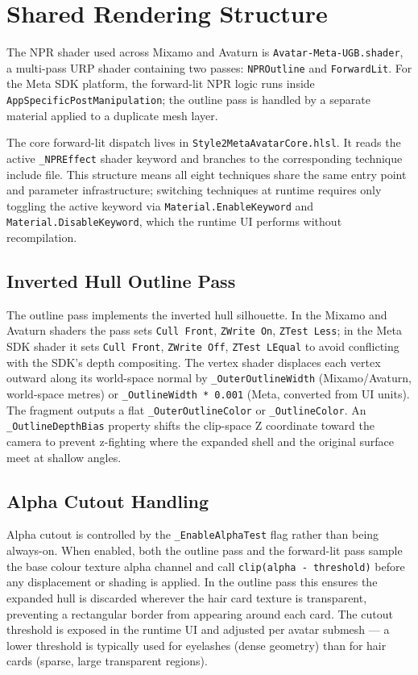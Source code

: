 \section{Shared Rendering Structure}
\label{sec:impl_shared}

The NPR shader used across Mixamo and Avaturn is \texttt{Avatar-Meta-UGB.shader}, a multi-pass URP shader containing two passes: \texttt{NPROutline} and \texttt{ForwardLit}. For the Meta SDK platform, the forward-lit NPR logic runs inside \texttt{AppSpecificPostManipulation}; the outline pass is handled by a separate material applied to a duplicate mesh layer.

The core forward-lit dispatch lives in \texttt{Style2MetaAvatarCore.hlsl}. It reads the active \texttt{\_NPREffect} shader keyword and branches to the corresponding technique include file. This structure means all eight techniques share the same entry point and parameter infrastructure; switching techniques at runtime requires only toggling the active keyword via \texttt{Material.EnableKeyword} and \texttt{Material.DisableKeyword}, which the runtime UI performs without recompilation.

\subsection{Inverted Hull Outline Pass}
\label{sec:impl_outline}

The outline pass implements the inverted hull silhouette. In the Mixamo and Avaturn shaders the pass sets \texttt{Cull Front}, \texttt{ZWrite On}, \texttt{ZTest Less}; in the Meta SDK shader it sets \texttt{Cull Front}, \texttt{ZWrite Off}, \texttt{ZTest LEqual} to avoid conflicting with the SDK's depth compositing. The vertex shader displaces each vertex outward along its world-space normal by \texttt{\_OuterOutlineWidth} (Mixamo/Avaturn, world-space metres) or \texttt{\_OutlineWidth * 0.001} (Meta, converted from UI units). The fragment outputs a flat \texttt{\_OuterOutlineColor} or \texttt{\_OutlineColor}. An \texttt{\_OutlineDepthBias} property shifts the clip-space Z coordinate toward the camera to prevent z-fighting where the expanded shell and the original surface meet at shallow angles.

\subsection{Alpha Cutout Handling}
\label{sec:impl_alpha}

Alpha cutout is controlled by the \texttt{\_EnableAlphaTest} flag rather than being always-on. When enabled, both the outline pass and the forward-lit pass sample the base colour texture alpha channel and call \texttt{clip(alpha - threshold)} before any displacement or shading is applied. In the outline pass this ensures the expanded hull is discarded wherever the hair card texture is transparent, preventing a rectangular border from appearing around each card. The cutout threshold is exposed in the runtime UI and adjusted per avatar submesh — a lower threshold is typically used for eyelashes (dense geometry) than for hair cards (sparse, large transparent regions).


